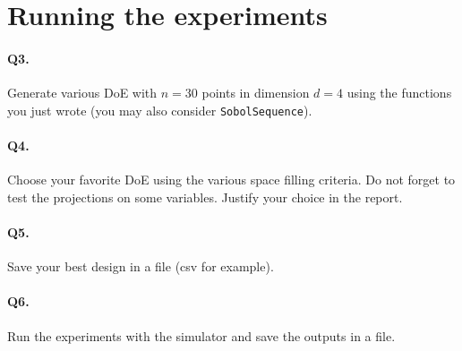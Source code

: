 \documentclass[12pt]{scrartcl}
\begin{document}
\section{Running the experiments}


\paragraph{Q3.} Generate various DoE with $n=30$ points in dimension $d=4$ using the functions you just wrote (you may also consider \texttt{SobolSequence}).

\paragraph{Q4.} Choose your favorite DoE using the various space filling criteria. Do not forget to test the projections on some variables. Justify your choice in the report.

\paragraph{Q5.} Save your best design in a file (csv for example).

\paragraph{Q6.} Run the experiments with the simulator and save the outputs in a file.
\end{document}
